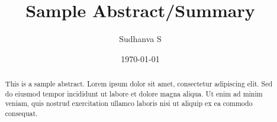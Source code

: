 \documentclass{article}
\title{Sample Abstract/Summary}
\author{Sudhanva S}
\date{\today}
\begin{document}
\maketitle
\begin{abstract}
This is a sample abstract. Lorem ipsum dolor sit amet, consectetur adipiscing elit. Sed do eiusmod
tempor incididunt ut labore et dolore magna aliqua. Ut enim ad minim veniam, quis nostrud
exercitation ullamco laboris nisi ut aliquip ex ea commodo consequat.
\end{abstract}
\end{document}
